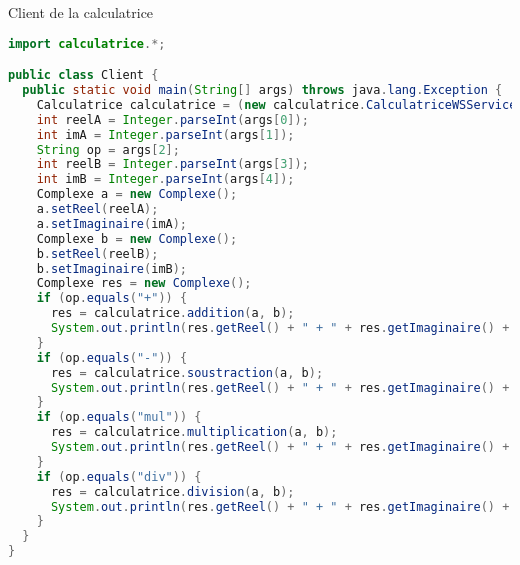 \documentclass{article}
\begin{document}
Client de la calculatrice
\begin{lstlisting}[language=JAVA]
import calculatrice.*;

public class Client {
  public static void main(String[] args) throws java.lang.Exception {
    Calculatrice calculatrice = (new calculatrice.CalculatriceWSService()).getCalculatriceWSPort();
    int reelA = Integer.parseInt(args[0]);
    int imA = Integer.parseInt(args[1]);
    String op = args[2];
    int reelB = Integer.parseInt(args[3]);
    int imB = Integer.parseInt(args[4]);
    Complexe a = new Complexe();
    a.setReel(reelA);
    a.setImaginaire(imA);
    Complexe b = new Complexe();
    b.setReel(reelB);
    b.setImaginaire(imB);
    Complexe res = new Complexe();
    if (op.equals("+")) {
      res = calculatrice.addition(a, b);
      System.out.println(res.getReel() + " + " + res.getImaginaire() + "i");
    }
    if (op.equals("-")) {
      res = calculatrice.soustraction(a, b);
      System.out.println(res.getReel() + " + " + res.getImaginaire() + "i");
    }
    if (op.equals("mul")) {
      res = calculatrice.multiplication(a, b);
      System.out.println(res.getReel() + " + " + res.getImaginaire() + "i");
    }
    if (op.equals("div")) {
      res = calculatrice.division(a, b);
      System.out.println(res.getReel() + " + " + res.getImaginaire() + "i");
    }
  }
}
\end{lstlisting}
\end{document}
